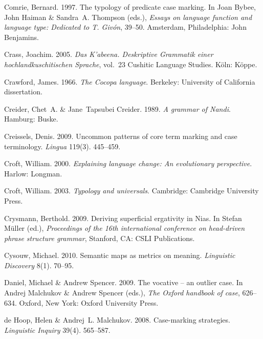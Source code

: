 \documentclass[ number=1
			   ,series=sidl
				,url=http://langsci-press.org/catalog/book/18 
			   ,isbn=978-3-944675-19-0
			   ,output=long   %
			  ]{LSP/langsci}
\begin{document}
\begin{thebibliography}{190}
Comrie, Bernard. 1997.
\newblock The typology of predicate case marking.
\newblock In Joan Bybee, John Haiman \& Sandra~A. Thompson (eds.), \emph{Essays
  on language function and language type: {D}edicated to {T.} {G}iv{\'o}n},
  39--50. Amsterdam, Philadelphia: John Benjamins.

Crass, Joachim. 2005.
\newblock \emph{Das {K'}abeena. {D}eskriptive {G}rammatik einer
  hochlandkuschitischen {S}prache}, vol.~23 Cushitic Language Studies.
\newblock K{\"o}ln: K{\"o}ppe.

Crawford, James. 1966.
\newblock \emph{The {C}ocopa language}.
\newblock Berkeley: University of California dissertation.

Creider, Chet~A. \& Jane~Tapsubei Creider. 1989.
\newblock \emph{A grammar of {N}andi}.
\newblock Hamburg: Buske.

Creissels, Denis. 2009.
\newblock Uncommon patterns of core term marking and case terminology.
\newblock \emph{Lingua} 119(3). 445--459.

Croft, William. 2000.
\newblock \emph{Explaining language change: {A}n evolutionary perspective}.
\newblock Harlow: Longman.

Croft, William. 2003.
\newblock \emph{Typology and universals}.
\newblock Cambridge: Cambridge University Press.

Crysmann, Berthold. 2009.
\newblock Deriving superficial ergativity in {N}ias.
\newblock In Stefan M\"{u}ller (ed.), \emph{Proceedings of the 16th
  international conference on head-driven phrase structure grammar}, Stanford,
  CA: CSLI Publications.

Cysouw, Michael. 2010.
\newblock Semantic maps as metrics on meaning.
\newblock \emph{Linguistic Discovery} 8(1). 70--95.

Daniel, Michael \& Andrew Spencer. 2009.
\newblock The vocative -- an outlier case.
\newblock In Andrej Malchukov \& Andrew Spencer (eds.), \emph{The {O}xford
  handbook of case}, 626--634. Oxford, New York: Oxford University Press.

{de Hoop}, Helen \& Andrej~L. Malchukov. 2008.
\newblock Case-marking strategies.
\newblock \emph{Linguistic Inquiry} 39(4). 565--587.


\end{thebibliography}
\end{document}
